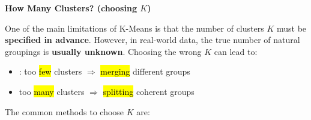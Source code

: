 \begin{flushleft}
    \textcolor{Green3}{ \textbf{How Many Clusters? (choosing $K$)}}
\end{flushleft}
One of the main limitations of K-Means is that the number of clusters $K$ must be \textbf{specified in advance}. However, in real-world data, the true number of natural groupings is \textbf{usually unknown}. Choosing the wrong $K$ can lead to:
\begin{itemize}
    \item {}: too \hl{few} clusters $\Rightarrow$ \hl{merging} different groups
    \item {} too \hl{many} clusters $\Rightarrow$ \hl{splitting} coherent groups
\end{itemize}
The common methods to choose $K$ are:
